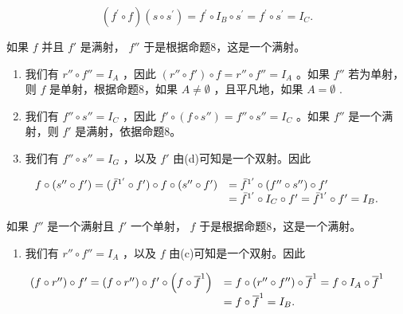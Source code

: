 \[
(f ^ {\prime} \circ f) (s \circ s ^ {\prime}) = f ^ {\prime} \circ I _ {B} \circ s ^ {\prime} = f ^ {\prime} \circ s ^ {\prime} = I _ {C}.
\]

如果 \(f\) 并且 \(f'\) 是满射， \(f''\) 于是根据命题8，这是一个满射。

\begin{enumerate}
\def\labelenumi{(\alph{enumi})}
\setcounter{enumi}{2}
\item
  我们有 \(r'' \circ f'' = I_A\) ，因此 \((r'' \circ f') \circ f = r'' \circ f'' = I_A\) 。如果 \(f''\) 若为单射，则 \(f\) 是单射，根据命题8，如果 \(A \neq \emptyset\) ，且平凡地，如果 \(A = \emptyset\) .
\item
  我们有 \(f'' \circ s'' = I_C\) ，因此 \(f' \circ (f \circ s'') = f'' \circ s'' = I_C\) 。如果 \(f''\) 是一个满射，则 \(f'\) 是满射，依据命题8。
\item
  我们有 \(f'' \circ s'' = I_G\) ，以及 \(f'\) 由(d)可知是一个双射。因此
\end{enumerate}

\[
\begin{array}{r l} f \circ (s ^ {\prime \prime} \circ f ^ {\prime}) = (\bar {f} ^ {1 ^ {\prime}} \circ f ^ {\prime}) \circ f \circ (s ^ {\prime \prime} \circ f ^ {\prime}) & = \bar {f} ^ {1 ^ {\prime}} \circ (f ^ {\prime \prime} \circ s ^ {\prime \prime}) \circ f ^ {\prime} \\ & = \bar {f} ^ {1 ^ {\prime}} \circ I _ {C} \circ f ^ {\prime} = \bar {f} ^ {1 ^ {\prime}} \circ f ^ {\prime} = I _ {B}. \end{array}
\]

如果 \(f''\) 是一个满射且 \(f'\) 一个单射， \(f\) 于是根据命题8，这是一个满射。

\begin{enumerate}
\def\labelenumi{(\alph{enumi})}
\setcounter{enumi}{5}
\tightlist
\item
  我们有 \(r'' \circ f'' = I_A\) ，以及 \(f\) 由(c)可知是一个双射。因此
\end{enumerate}

\[
\begin{array}{r l} \left(f \circ r ^ {\prime \prime}\right) \circ f ^ {\prime} = \left(f \circ r ^ {\prime \prime}\right) \circ f ^ {\prime} \circ \left(f \circ \overline {{f}} ^ {1}\right) & = f \circ \left(r ^ {\prime \prime} \circ f ^ {\prime \prime}\right) \circ \overline {{f}} ^ {1} = f \circ I _ {A} \circ \overline {{f}} ^ {1} \\ & = f \circ \overline {{f}} ^ {1} = I _ {B}. \end{array}
\]

